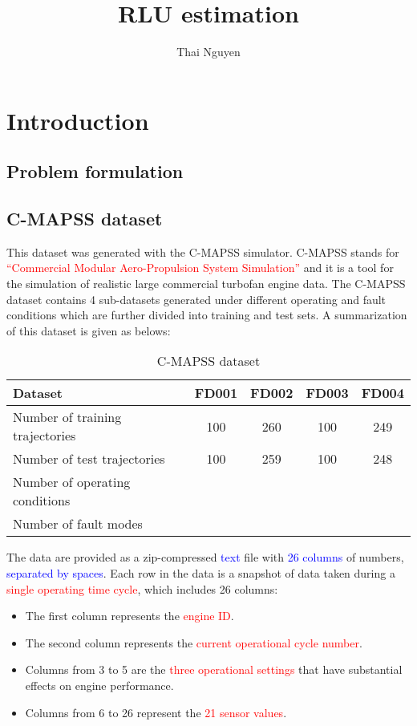 \documentclass{article}
\title{\vspace{-40pt}\Large RLU estimation}
\author{\normalsize Thai Nguyen}
\date{}
\DeclareRobustCommand{\&}{%
	\ifdim\fontdimen1\font>0pt
	\textsl{\symbol{`\&}}%
	\else
	\symbol{`\&}%
	\fi
}
\newcommand{\blue}[1]{\textcolor{blue}{#1}}
\newcommand{\red}[1]{\textcolor{red}{#1}}
\begin{document}
\maketitle

\section{Introduction}
\subsection{Problem formulation}


\subsection{C-MAPSS dataset}
This dataset was generated with the C-MAPSS simulator. C-MAPSS stands for \red{\enquote{Commercial Modular Aero-Propulsion System Simulation}} and it is a tool for the simulation of realistic large commercial turbofan engine data. The C-MAPSS dataset contains 4 sub-datasets generated under different operating and fault conditions which are further divided into training and test sets. A summarization of this dataset is given as belows:

\begin{table}[H]
	\centering
	\begin{tabular}{lcccc}
		\hline
		Dataset                         & FD001 & FD002 & FD003 & FD004 \\ \hline \hline
		Number of training trajectories & 100   & 260   & 100   & 249   \\ \hline
		Number of test trajectories     & 100   & 259   & 100   & 248   \\ \hline
		Number of operating conditions  &       &       &       &       \\ \hline
		Number of fault modes           &       &       &       &       \\ \hline
	\end{tabular}
	\caption{C-MAPSS dataset } 
\end{table} 

The data are provided as a zip-compressed \blue{text} file with \blue{26 columns} of numbers, \blue{separated by spaces}. Each row in the data is a snapshot of data taken during a \red{single operating time cycle}, which includes 26 columns:
\begin{itemize}
	\item The first column represents the \red{engine ID}.
	\item The second column represents the \red{current operational cycle number}.
	\item Columns from 3 to 5 are the \red{three operational settings} that have substantial effects on engine performance.
	\item Columns from 6 to 26 represent the \red{21 sensor values}.
\end{itemize}
\end{document}
